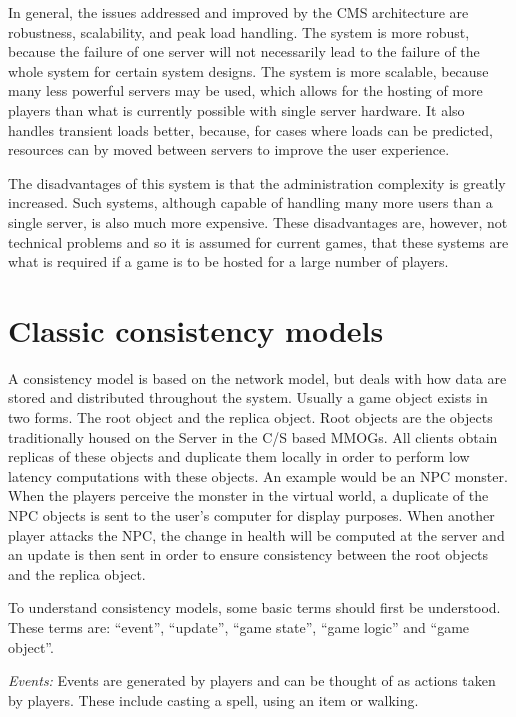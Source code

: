 \documentclass[10pt,a4paper,journal,cspaper,compsoc]{IEEEtran}
\begin{document}
In general, the issues addressed and improved by the \ac{CMS} architecture are robustness, scalability, and peak load handling. The system is more
robust, because the failure of one server will not necessarily lead to the failure of the whole system for certain system designs. The system is more
scalable, because many less powerful servers may be used, which allows for the hosting of more players than what is currently possible with single
server hardware. It also handles transient loads better, because, for cases where loads can be predicted, resources can by moved between servers to
improve the user experience.

The disadvantages of this system is that the administration complexity is greatly increased. Such systems, although capable of handling many more
users than a single server, is also much more expensive. These disadvantages are, however, not technical problems and so it is assumed for current
games, that these systems are what is required if a game is to be hosted for a large number of players.

\section{Classic consistency models}
\label{classic_models}

A consistency model is based on the network model, but deals with how data are stored and distributed throughout the system. Usually a game object
exists in two forms. The root object and the replica object. Root objects are the objects traditionally housed on the Server in the C/S based MMOGs.
All clients obtain replicas of these objects and duplicate them locally in order to perform low latency computations with these objects. An example
would be an NPC monster. When the players perceive the monster in the virtual world, a duplicate of the NPC objects is sent to the user's computer
for display purposes. When another player attacks the NPC, the change in health will be computed at the server and an update is then sent in order to
ensure consistency between the root objects and the replica object.

To understand consistency models, some basic terms should first be understood. These terms are: ``event'', ``update'', ``game state'', ``game logic''
and ``game object''.

\emph{Events:} Events are generated by players and can be thought of as actions taken by players. These include casting a spell, using an item
    or walking.
\end{document}
